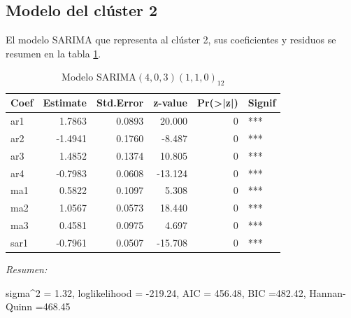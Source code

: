 \documentclass[12pt,oneside]{book}\usepackage[]{graphicx}\usepackage[]{color}
\newenvironment{knitrout}{}{} %
\theoremstyle{definition} %
\begin{document}
\subsection{Modelo del clúster 2}


El modelo SARIMA que representa al clúster 2, sus coeficientes y residuos se resumen en la tabla \ref{tab:sarima_cl2}.


\begin{knitrout}
\color{fgcolor}\begin{table}

\caption{\label{tab:unnamed-chunk-79}\label{tab:sarima_cl2}Modelo SARIMA$(4,0,3)(1,1,0)_{12}$}
\centering
\begin{threeparttable}
\begin{tabular}[t]{lrrrrl}
\toprule
Coef & Estimate & Std.Error & z-value & Pr(>|z|) & Signif\\
\midrule
\rowcolor{gray!6}  ar1 & 1.7863 & 0.0893 & 20.000 & 0 & ***\\
ar2 & -1.4941 & 0.1760 & -8.487 & 0 & ***\\
\rowcolor{gray!6}  ar3 & 1.4852 & 0.1374 & 10.805 & 0 & ***\\
ar4 & -0.7983 & 0.0608 & -13.124 & 0 & ***\\
\rowcolor{gray!6}  ma1 & 0.5822 & 0.1097 & 5.308 & 0 & ***\\
\addlinespace
ma2 & 1.0567 & 0.0573 & 18.440 & 0 & ***\\
\rowcolor{gray!6}  ma3 & 0.4581 & 0.0975 & 4.697 & 0 & ***\\
sar1 & -0.7961 & 0.0507 & -15.708 & 0 & ***\\
\bottomrule
\end{tabular}
\begin{tablenotes}
\item \textit{Resumen:} 
\item sigma\textasciicircum{}2 = 1.32, loglikelihood = -219.24, AIC = 456.48, BIC =482.42, Hannan-Quinn =468.45
\end{tablenotes}
\end{threeparttable}
\end{table}


\end{knitrout}
\end{document}
